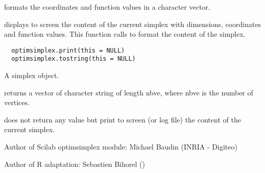 %
\begin{Description}\relax
{} formats the coordinates and function values in a
character vector.

 displays to screen the content of the current
simplex with dimensions, coordinates and function values. This function calls
 to format the content of the simplex.
\end{Description}
%
\begin{Usage}
\begin{verbatim}
  optimsimplex.print(this = NULL)
  optimsimplex.tostring(this = NULL)
\end{verbatim}
\end{Usage}
%
\begin{Arguments}
\begin{ldescription}
\item[\code{this}] A simplex object.
\end{ldescription}
\end{Arguments}
%
\begin{Value}
 returns a vector of character string of length
nbve, where nbve is the number of vertices.

 does not return any value but print to screen (or
log file) the content of the current simplex.
\end{Value}
%
\begin{Author}\relax
Author of Scilab optimsimplex module: Michael Baudin (INRIA - Digiteo)

Author of R adaptation: Sebastien Bihorel ()
\end{Author}
%
\begin{SeeAlso}\relax
{}
\end{SeeAlso}
%
\begin{Examples}
\end{Examples}
